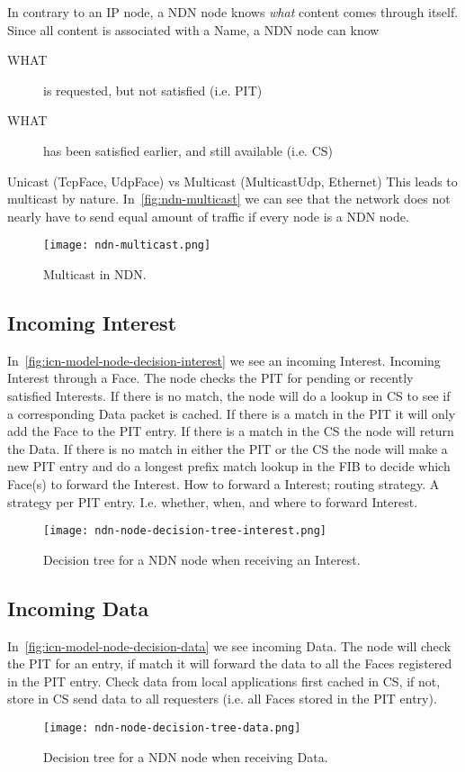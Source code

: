 In contrary to an \gls{IP} node, a \gls{NDN} node knows \textit{what} content comes through itself. 
Since all content is associated with a Name, a \gls{NDN} node can know 
\begin{description}
  \item[WHAT] is requested, but not satisfied (i.e. \gls{PIT})
  \item[WHAT] has been satisfied earlier, and still available (i.e. \gls{CS})
\end{description}

Unicast (TcpFace, UdpFace) vs Multicast (MulticastUdp, Ethernet)
This leads to multicast by nature.
In~\autoref{fig:ndn-multicast} we can see that the network does not nearly have to send equal amount of traffic if every node is a \gls{NDN} node.
\begin{figure}[H]
  \centering
  \texttt{[image: ndn-multicast.png]}
  \caption{Multicast in NDN.}
  \label{fig:ndn-multicast}
\end{figure}
 
\subsection{Incoming Interest}\label{incoming-interest}
In~\autoref{fig:icn-model-node-decision-interest} we see an incoming Interest.
Incoming Interest through a Face. The node checks the \gls{PIT} for pending or recently satisfied Interests. 
If there is no match, the node will do a lookup in \gls{CS} to see if a corresponding Data packet is cached. 
If there is a match in the \gls{PIT} it will only add the Face to the \gls{PIT} entry. If there is a match in the \gls{CS} the node will return the Data. 
If there is no match in either the \gls{PIT} or the \gls{CS} the node will make a new \gls{PIT} entry and do a longest prefix match lookup in the \gls{FIB} to decide which Face(s) to forward the Interest. 
How to forward a Interest; routing strategy. 
A strategy per \gls{PIT} entry. 
I.e. whether, when, and where to forward Interest.
\begin{figure}[H]
  \centering
  \texttt{[image: ndn-node-decision-tree-interest.png]}
  \caption{Decision tree for a NDN node when receiving an Interest.}
  \label{fig:icn-model-node-decision-interest}
\end{figure}

\subsection{Incoming Data}
In~\autoref{fig:icn-model-node-decision-data} we see incoming Data.
The node will check  the \gls{PIT} for an entry, if match it will forward the data to all the Faces registered in the \gls{PIT} entry.
Check data from local applications first cached in \gls{CS}, if not, store in \gls{CS} send data to all requesters (i.e. all Faces stored in the \gls{PIT} entry).
\begin{figure}[H]
  \centering
  \texttt{[image: ndn-node-decision-tree-data.png]}
  \caption{Decision tree for a NDN node when receiving Data.}
  \label{fig:icn-model-node-decision-data}
\end{figure}


